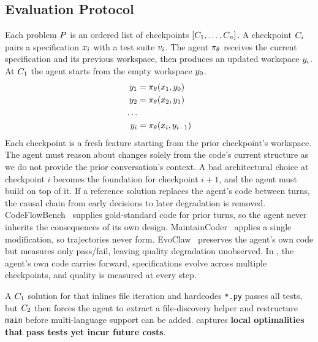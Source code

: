 \subsection{Evaluation Protocol}\label{sec:eval-setup}

Each problem $P$ is an ordered list of checkpoints $[C_{1},\ldots,C_{n}]$. A checkpoint $C_{i}$ pairs a specification $x_{i}$ with a test suite $v_{i}$. The agent $\pi_{\theta}$ receives the current specification and its previous workspace, then produces an updated workspace $y_{i}$. At $C_{1}$ the agent starts from the empty workspace $y_{0}$.
\begin{equation}\label{eq:problem-setup}
    \begin{aligned}
        y_{1} &= \pi_{\theta}(x_{1}, y_{0}) \\
        y_{2} &= \pi_{\theta}(x_{2}, y_{1})\\
        \ldots \\
        y_{i} &= \pi_{\theta}(x_{i}, y_{i-1})
    \end{aligned}
\end{equation}
Each checkpoint is a fresh feature starting from the prior checkpoint's workspace. The agent must reason about changes solely from the code's current structure as we do not provide the prior conversation's context. A bad architectural choice at checkpoint $i$ becomes the foundation for checkpoint $i+1$, and the agent must build on top of it. If a reference solution replaces the agent's code between turns, the causal chain from early decisions to later degradation is removed. CodeFlowBench~\citep{codeflowbench} supplies gold-standard code for prior turns, so the agent never inherits the consequences of its own design. MaintainCoder~\citep{maintaincoder} applies a single modification, so trajectories never form. EvoClaw~\citep{evoclaw} preserves the agent's own code but measures only pass/fail, leaving quality degradation unobserved. In \scb{}, the agent's own code carries forward, specifications evolve across multiple checkpoints, and quality is measured at every step.

A $C_{1}$ solution for \codesearch{} that inlines file iteration and hardcodes \texttt{*.py} passes all tests, but $C_{2}$ then forces the agent to extract a file-discovery helper and restructure \texttt{main} before multi-language support can be added. \scb{} captures \textbf{local optimalities that pass tests yet incur future costs}.

